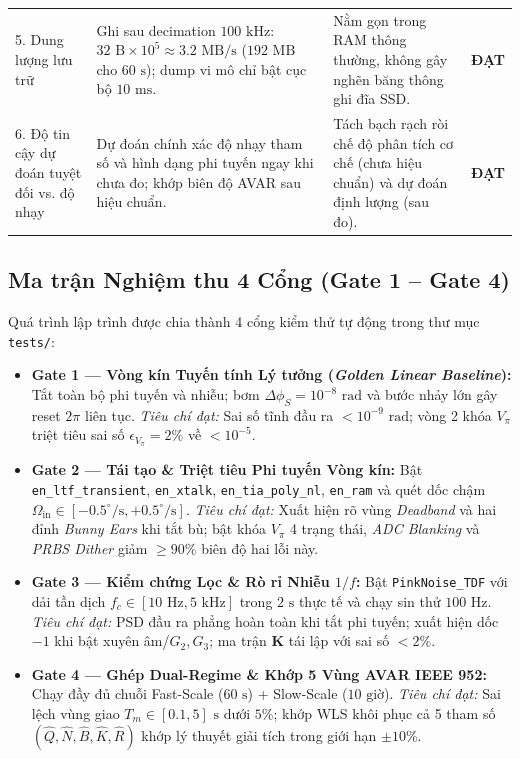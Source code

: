 \documentclass[11pt, a4paper]{article}
\begin{document}
\begin{table}[htbp]
\begin{tabular}{@{}L{3.1cm} L{4.7cm} L{5.8cm} L{2.1cm}@{}}
5. Dung lượng lưu trữ & Ghi sau decimation $100\text{ kHz}$: $32\text{ B} \times 10^5 \approx 3.2\text{ MB/s}$ ($192\text{ MB}$ cho $60\text{ s}$); dump vi mô chỉ bật cục bộ $10\text{ ms}$. & Nằm gọn trong RAM thông thường, không gây nghẽn băng thông ghi đĩa SSD. & \textbf{ĐẠT} \\
6. Độ tin cậy dự đoán tuyệt đối vs. độ nhạy & Dự đoán chính xác độ nhạy tham số và hình dạng phi tuyến ngay khi chưa đo; khớp biên độ AVAR sau hiệu chuẩn. & Tách bạch rạch ròi chế độ phân tích cơ chế (chưa hiệu chuẩn) và dự đoán định lượng (sau đo). & \textbf{ĐẠT} \\
\bottomrule
\end{tabular}
\end{table}

\subsection{Ma trận Nghiệm thu 4 Cổng (Gate 1 -- Gate 4)}
Quá trình lập trình được chia thành 4 cổng kiểm thử tự động trong thư mục \texttt{tests/}:
\begin{itemize}
    \item \textbf{Gate 1 --- Vòng kín Tuyến tính Lý tưởng (\emph{Golden Linear Baseline}):} Tắt toàn bộ phi tuyến và nhiễu; bơm $\Delta\phi_S = 10^{-8}\text{ rad}$ và bước nhảy lớn gây reset $2\pi$ liên tục. \emph{Tiêu chí đạt:} Sai số tĩnh đầu ra $< 10^{-9}\text{ rad}$; vòng 2 khóa $V_\pi$ triệt tiêu sai số $\epsilon_{V_\pi} = 2\%$ về $< 10^{-5}$.
    \item \textbf{Gate 2 --- Tái tạo \& Triệt tiêu Phi tuyến Vòng kín:} Bật \texttt{en\_ltf\_transient}, \texttt{en\_xtalk}, \texttt{en\_tia\_poly\_nl}, \texttt{en\_ram} và quét dốc chậm $\Omega_{\text{in}} \in [-0.5^\circ/\text{s}, +0.5^\circ/\text{s}]$. \emph{Tiêu chí đạt:} Xuất hiện rõ vùng \emph{Deadband} và hai đỉnh \emph{Bunny Ears} khi tắt bù; bật khóa $V_\pi$ 4 trạng thái, \emph{ADC Blanking} và \emph{PRBS Dither} giảm $\ge 90\%$ biên độ hai lỗi này.
    \item \textbf{Gate 3 --- Kiểm chứng Lọc \& Rò rỉ Nhiễu $1/f$:} Bật \texttt{PinkNoise\_TDF} với dải tần dịch $f_c \in [10\text{ Hz}, 5\text{ kHz}]$ trong $2\text{ s}$ thực tế và chạy sin thử $100\text{ Hz}$. \emph{Tiêu chí đạt:} PSD đầu ra phẳng hoàn toàn khi tắt phi tuyến; xuất hiện dốc $-1$ khi bật xuyên âm/$G_2, G_3$; ma trận $\mathbf{K}$ tái lập với sai số $< 2\%$.
    \item \textbf{Gate 4 --- Ghép Dual-Regime \& Khớp 5 Vùng AVAR IEEE 952:} Chạy đầy đủ chuỗi Fast-Scale ($60\text{ s}$) + Slow-Scale ($10\text{ giờ}$). \emph{Tiêu chí đạt:} Sai lệch vùng giao $T_m \in [0.1, 5]\text{ s}$ dưới $5\%$; khớp WLS khôi phục cả 5 tham số $(\hat{Q}, \hat{N}, \hat{B}, \hat{K}, \hat{R})$ khớp lý thuyết giải tích trong giới hạn $\pm 10\%$.
\end{itemize}
\end{document}
